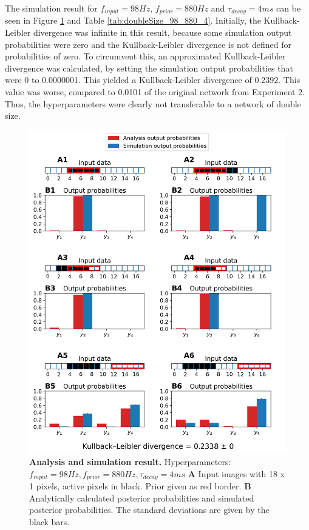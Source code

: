The simulation result for $f_{input} = 98 Hz$, $f_{prior} = 880 Hz$ and $\tau_{decay} = 4 ms$ can be seen in Figure \ref{fig:doubleSize_98_880_4} and Table \ref{tab:doubleSize_98_880_4}. Initially, the Kullback-Leibler divergence was infinite in this result, because some simulation output probabilities were zero and the Kullback-Leibler divergence is not defined for probabilities of zero. To circumvent this, an approximated Kullback-Leibler divergence was calculated, by setting the simulation output probabilities that were 0 to 0.0000001. This yielded a Kullback-Leibler divergence of 0.2392. This value was worse, compared to 0.0101 of the original network from Experiment 2. Thus, the hyperparameters were clearly not transferable to a network of double size.
\begin{figure}
  \includegraphics[width=\linewidth]{figures/1D/doubleSize/doubleSize_98_880_4.png}
      \caption{\textbf{Analysis and simulation result. } Hyperparameters: $f_{input} = 98 Hz, f_{prior} = 880 Hz, \tau_{decay} = 4 ms$ \textbf{A} Input images with 18 x 1 pixels, active pixels in black. Prior given as red border. \textbf{B} Analytically calculated posterior probabilities and simulated posterior probabilities. The standard deviations are given by the black bars.}
  \label{fig:doubleSize_98_880_4}
\end{figure}

